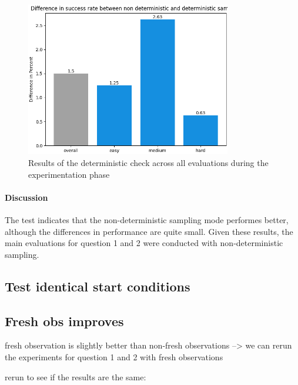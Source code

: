\begin{figure}
    \centering
    \includegraphics[width=0.8\textwidth]{Bilder/notebook_images/deterministic_check_results.png}
    \caption{Results of the deterministic check across all evaluations during the experimentation phase}
    \label{fig:deterministic_check_result}
\end{figure}

\paragraph{Discussion}
The test indicates that the non-deterministic sampling mode performes better, although the differences in performance are quite small. Given these results, the main evaluations for question 1 and 2 were conducted with non-deterministic sampling.

\subsection{Test identical start conditions}


\subsection{Fresh obs improves}

fresh observation is slightly better than non-fresh observations
--> we can rerun the experiments for question 1 and 2 with fresh observations

rerun to see if the results are the same:


